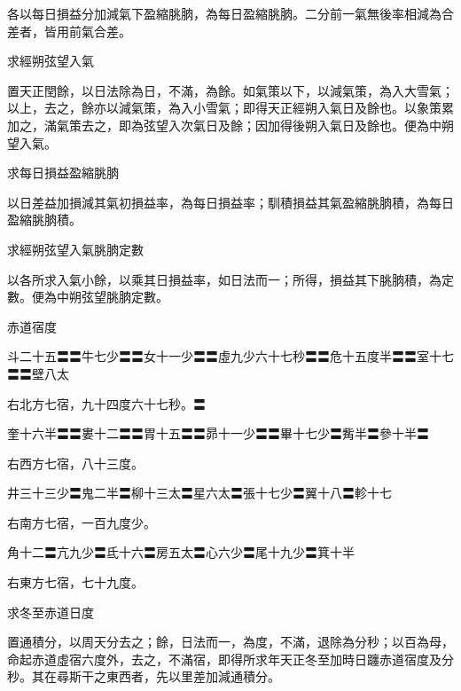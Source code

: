 \begin{pinyinscope}
 各以每日損益分加減氣下盈縮朓朒，為每日盈縮朓朒。二分前一氣無後率相減為合差者，皆用前氣合差。



 求經朔弦望入氣



 置天正閏餘，以日法除為日，不滿，為餘。如氣策以下，以減氣策，為入大雪氣；以上，去之，餘亦以減氣策，為入小雪氣；即得天正經朔入氣日及餘也。以象策累加之，滿氣策去之，即為弦望入次氣日及餘；因加得後朔入氣日及餘也。便為中朔望入氣。



 求每日損益盈縮朓朒



 以日差益加損減其氣初損益率，為每日損益率；馴積損益其氣盈縮朓朒積，為每日盈縮朓朒積。



 求經朔弦望入氣朓朒定數



 以各所求入氣小餘，以乘其日損益率，如日法而一；所得，損益其下朓朒積，為定數。便為中朔弦望朓朒定數。



 赤道宿度



 斗二十五〓〓牛七少〓〓女十一少〓〓虛九少六十七秒〓〓危十五度半〓〓室十七〓〓壁八太



 右北方七宿，九十四度六十七秒。〓



 奎十六半〓〓婁十二〓〓胃十五〓〓昴十一少〓〓畢十七少〓觜半〓參十半〓



 右西方七宿，八十三度。



 井三十三少〓鬼二半〓柳十三太〓星六太〓張十七少〓翼十八〓軫十七



 右南方七宿，一百九度少。



 角十二〓亢九少〓氐十六〓房五太〓心六少〓尾十九少〓箕十半



 右東方七宿，七十九度。



 求冬至赤道日度



 置通積分，以周天分去之；餘，日法而一，為度，不滿，退除為分秒；以百為母，命起赤道虛宿六度外，去之，不滿宿，即得所求年天正冬至加時日躔赤道宿度及分秒。其在尋斯干之東西者，先以里差加減通積分。




\end{pinyinscope}
